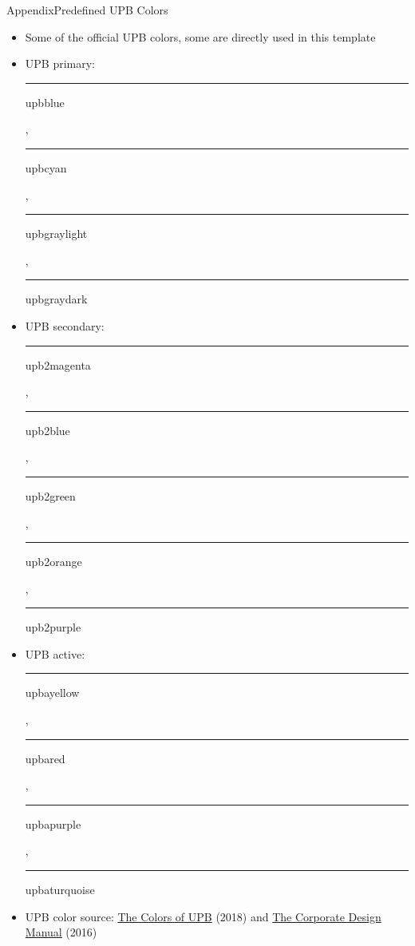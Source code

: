 \documentclass{beamer}
\begin{document}
\begin{frame}{Appendix}{Predefined UPB Colors}
	\begin{itemize}
		\item Some of the official UPB colors, some are directly used in this template
		\item UPB primary:
		      {\color{upbblue}\rule{.7cm}{.4cm} upbblue},
		      {\color{upbcyan}\rule{.7cm}{.4cm} upbcyan},
		      {\color{upbgraylight}\rule{.7cm}{.4cm} upbgraylight},
		      {\color{upbgraydark}\rule{.7cm}{.4cm} upbgraydark}
		\item UPB secondary:
		      {\color{upb2magenta}\rule{.7cm}{.4cm} upb2magenta},
		      {\color{upb2blue}\rule{.7cm}{.4cm} upb2blue},
		      {\color{upb2green}\rule{.7cm}{.4cm} upb2green},
		      {\color{upb2orange}\rule{.7cm}{.4cm} upb2orange},
		      {\color{upb2purple}\rule{.7cm}{.4cm} upb2purple}
		\item UPB active:
		      {\color{upbayellow}\rule{.7cm}{.4cm} upbayellow},
		      {\color{upbared}\rule{.7cm}{.4cm} upbared},
		      {\color{upbapurple}\rule{.7cm}{.4cm} upbapurple},
		      {\color{upbaturquoise}\rule{.7cm}{.4cm} upbaturquoise}
		\item UPB color source:
		      \href{https://www.uni-paderborn.de/en/university/press-communications-marketing/design-vorgaben-templates/colors}{The Colors of UPB} (2018) and
		      \href{https://www.uni-paderborn.de/en/university/press-communications-marketing/corporate-design-manual}{The Corporate Design Manual} (2016)
	\end{itemize}
\end{frame}
\end{document}
